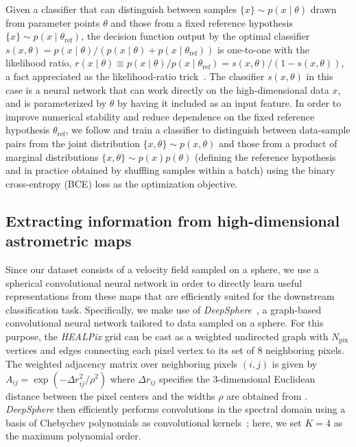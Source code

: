 \documentclass[twocolumn,linenumbers,anonymous]{aastex631}
\newcommand{\package}[1]{\textsl{#1}\xspace}
\newcommand{\healpix}{\package{HEALPix}}
\newcommand{\deepsphere}{\package{DeepSphere}}
\begin{document}
Given a classifier that can distinguish between samples $\{x\} \sim p(x\mid\theta)$ drawn from parameter points $\theta$ and those from a fixed reference hypothesis $\{x\} \sim p(x\mid\theta_\mathrm{ref})$, the decision function output by the optimal classifier $s(x, \theta) = {p(x\mid\theta)}/{\left(p(x\mid\theta) + p(x\mid\theta_\mathrm{ref})\right)}$ is one-to-one with the likelihood ratio, $r(x\mid \theta) \equiv {p(x\mid\theta)}/{p(x\mid\theta_\mathrm{ref})}  = {s(x, \theta)}/{\left(1 - s(x, \theta)\right)}$, a fact appreciated as the likelihood-ratio trick~\citep{Cranmer:2015bka,mohamed2017learning}. 
The classifier $s(x, \theta)$ in this case is a neural network that can work directly on the high-dimensional data $x$, and is parameterized by $\theta$ by having it included as an input feature. In order to improve numerical stability and reduce dependence on the fixed reference hypothesis $\theta_\mathrm{ref}$, we follow \citet{Hermans:2019ioj} and train a classifier to distinguish between data-sample pairs from the joint distribution $\{x, \theta\} \sim p(x,\theta)$ and those from a product of marginal distributions $\{x, \theta\} \sim p(x)p(\theta)$ (defining the reference hypothesis and in practice obtained by shuffling samples within a batch) using the binary cross-entropy (BCE) loss as the optimization objective. 

\subsection{Extracting information from high-dimensional astrometric maps} 

Since our dataset consists of a velocity field sampled on a sphere, we use a spherical convolutional neural network in order to directly learn useful representations from these maps that are efficiently suited for the downstream classification task. Specifically, we make use of \deepsphere~\citep{2020arXiv201215000D,deepsphere_cosmo}, a graph-based convolutional neural network tailored to data sampled on a sphere. For this purpose, the \healpix grid can be cast as a weighted undirected graph with $N_\mathrm{pix}$ vertices and edges connecting each pixel vertex to its set of 8 neighboring pixels. The weighted adjacency matrix over neighboring pixels $(i, j)$ is given by $A_{ij} = \exp \left(-{\Delta r_{ij}^{2}}/{\rho^{2}}\right)$ where $\Delta r_{ij}$ specifies the 3-dimensional Euclidean distance between the pixel centers and the widths $\rho$ are obtained from \citet{2020arXiv201215000D}. \deepsphere then efficiently performs convolutions in the spectral domain using a basis of Chebychev polynomials as convolutional kernels~\citep{2016arXiv160609375D}; here, we set $K=4$ as the maximum polynomial order. 
\end{document}
